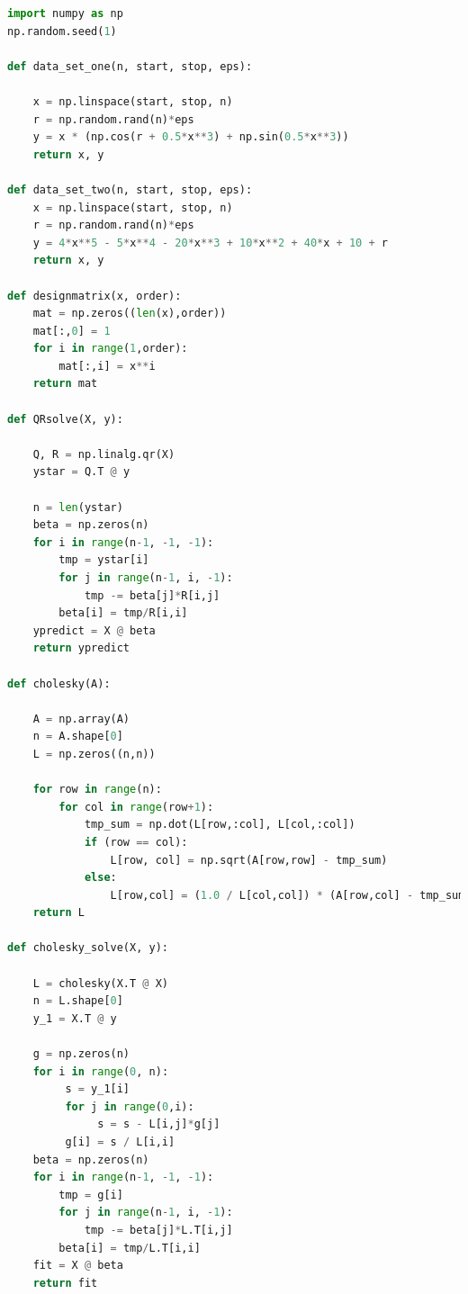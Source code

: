\documentclass[11pt]{article}
\begin{document}
\begin{lstlisting}[language=Python]
import numpy as np
np.random.seed(1)

def data_set_one(n, start, stop, eps):

    x = np.linspace(start, stop, n)
    r = np.random.rand(n)*eps
    y = x * (np.cos(r + 0.5*x**3) + np.sin(0.5*x**3))
    return x, y

def data_set_two(n, start, stop, eps):
    x = np.linspace(start, stop, n)
    r = np.random.rand(n)*eps
    y = 4*x**5 - 5*x**4 - 20*x**3 + 10*x**2 + 40*x + 10 + r
    return x, y

def designmatrix(x, order):
    mat = np.zeros((len(x),order))
    mat[:,0] = 1
    for i in range(1,order):
        mat[:,i] = x**i
    return mat

def QRsolve(X, y):

    Q, R = np.linalg.qr(X)
    ystar = Q.T @ y

    n = len(ystar)
    beta = np.zeros(n)
    for i in range(n-1, -1, -1):
        tmp = ystar[i]
        for j in range(n-1, i, -1):
            tmp -= beta[j]*R[i,j]
        beta[i] = tmp/R[i,i]
    ypredict = X @ beta
    return ypredict

def cholesky(A):

    A = np.array(A)
    n = A.shape[0]
    L = np.zeros((n,n))

    for row in range(n):
        for col in range(row+1):
            tmp_sum = np.dot(L[row,:col], L[col,:col])
            if (row == col):
                L[row, col] = np.sqrt(A[row,row] - tmp_sum)
            else:
                L[row,col] = (1.0 / L[col,col]) * (A[row,col] - tmp_sum)
    return L

def cholesky_solve(X, y):

    L = cholesky(X.T @ X)
    n = L.shape[0]
    y_1 = X.T @ y

    g = np.zeros(n)
    for i in range(0, n):
         s = y_1[i]
         for j in range(0,i):
              s = s - L[i,j]*g[j]
         g[i] = s / L[i,i]
    beta = np.zeros(n)
    for i in range(n-1, -1, -1):
        tmp = g[i]
        for j in range(n-1, i, -1):
            tmp -= beta[j]*L.T[i,j]
        beta[i] = tmp/L.T[i,i]
    fit = X @ beta
    return fit

\end{lstlisting}
\end{document}
